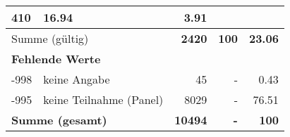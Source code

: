 \begin{longtable}{lXrrr}
       \num{410} &
       \num[round-mode=places,round-precision=2]{16,94} &
         \num[round-mode=places,round-precision=2]{3,91} \\
     \midrule
     \multicolumn{2}{l}{Summe (gültig)} &
       \textbf{\num{2420}} &
     \textbf{100} &
       \textbf{\num[round-mode=places,round-precision=2]{23,06}} \\
     \multicolumn{5}{l}{\textbf{Fehlende Werte}}\\
       -998 &
       keine Angabe &
         \num{45} &
        - &
         \num[round-mode=places,round-precision=2]{0,43} \\
       -995 &
       keine Teilnahme (Panel) &
         \num{8029} &
        - &
         \num[round-mode=places,round-precision=2]{76,51} \\
     \midrule
     \multicolumn{2}{l}{\textbf{Summe (gesamt)}} &
          \textbf{\num{10494}} &
        \textbf{-} &
        \textbf{100} \\
     \bottomrule
     \end{longtable}
     

